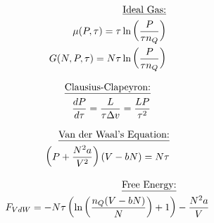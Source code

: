\documentclass[12pt]{article}
\begin{document}
\vspace{-20pt}

\begin{multicols}{2}

  \begin{equation*}
    \begin{split}
      \text{\underline{Ideal Gas:}}\\
      \mu(P,\tau)=\tau\ln\left( \frac{P}{\tau n_Q} \right)\\
      G(N,P,\tau)=N\tau\ln\left( \frac{P}{\tau n_Q} \right)
    \end{split}
  \end{equation*}

  \begin{equation*}
    \begin{split}
      \text{\underline{Clausius-Clapeyron:}}\\
      \frac{dP}{d\tau}=\frac{L}{\tau\Delta v}=\frac{LP}{\tau^2}
    \end{split}
  \end{equation*}

\end{multicols}

\vspace{-35pt}

\begin{multicols}{2}

  \begin{equation*}
    \begin{split}
      \text{\underline{Van der Waal's Equation:}}\\
      \left( P+\frac{N^2a}{V^2} \right)\left( V-bN \right)=N\tau
    \end{split}
  \end{equation*}

  \begin{equation*}
    \begin{split}
      \text{\underline{Free Energy:}}&\\
      F_{VdW}=-N\tau\left( \ln\left( \frac{n_Q(V-bN)}{N} \right)+1 \right)&-\frac{N^2a}{V}
    \end{split}
  \end{equation*}

\end{multicols}
\end{document}
